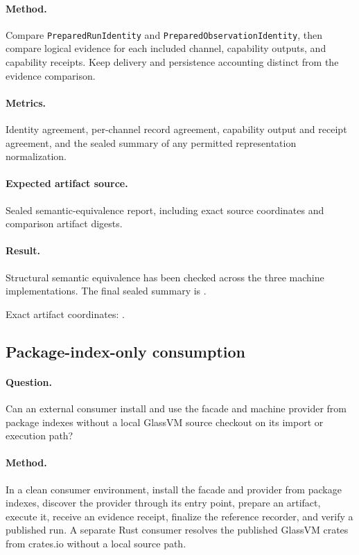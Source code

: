 \paragraph{Method.} Compare \texttt{PreparedRunIdentity} and
\texttt{PreparedObservationIdentity}, then compare logical evidence for each
included channel, capability outputs, and capability receipts. Keep delivery
and persistence accounting distinct from the evidence comparison.

\paragraph{Metrics.} Identity agreement, per-channel record agreement,
capability output and receipt agreement, and the sealed summary of any
permitted representation normalization.

\paragraph{Expected artifact source.} Sealed semantic-equivalence report,
including exact source coordinates and comparison artifact digests.

\paragraph{Result.} Structural semantic equivalence has been checked across
the three machine implementations. The final sealed summary is
\TBAEquivalenceResult.\par
\noindent Exact artifact coordinates: \TBASourceCoordinates.

\subsection{Package-index-only consumption}
\label{sec:package-consumption}

\paragraph{Question.} Can an external consumer install and use the facade
and machine provider from package indexes without a local GlassVM source
checkout on its import or execution path?

\paragraph{Method.} In a clean consumer environment, install the facade and
provider from package indexes, discover the provider through its entry point,
prepare an artifact, execute it, receive an evidence receipt, finalize the
reference recorder, and verify a published run. A separate Rust consumer
resolves the published GlassVM crates from crates.io without a local source
path.

